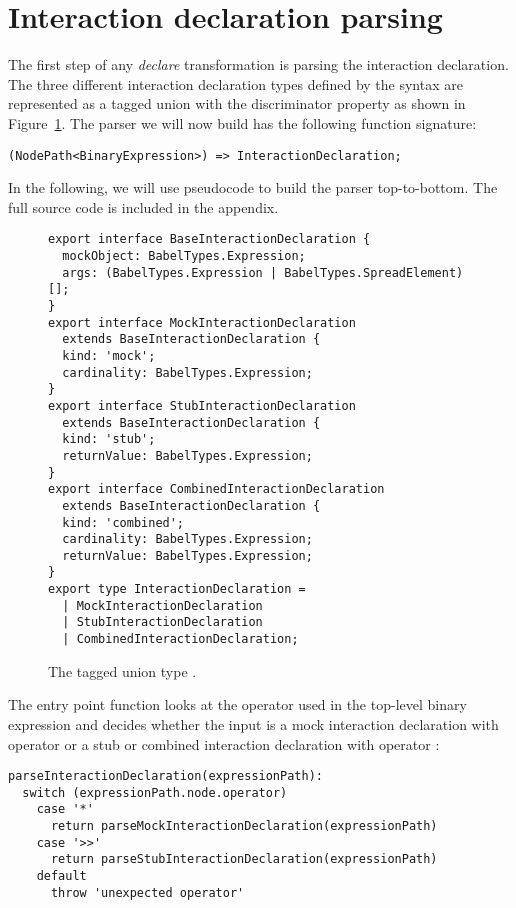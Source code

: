 \section{Interaction declaration parsing}
The first step of any \textit{declare} transformation
is parsing the interaction declaration.
The three different interaction declaration types defined by the syntax
are represented as a tagged union 
with the discriminator property 
as shown in Figure~\ref{fig:InteractionDeclarationType}.
The parser we will now build has the following function signature:
\begin{verbatim}
(NodePath<BinaryExpression>) => InteractionDeclaration;
\end{verbatim}
In the following, we will use pseudocode to build the parser top-to-bottom.
The full source code is included in the appendix.

\begin{figure}
  \begin{verbatim}
export interface BaseInteractionDeclaration {
  mockObject: BabelTypes.Expression;
  args: (BabelTypes.Expression | BabelTypes.SpreadElement)[];
}
export interface MockInteractionDeclaration
  extends BaseInteractionDeclaration {
  kind: 'mock';
  cardinality: BabelTypes.Expression;
}
export interface StubInteractionDeclaration
  extends BaseInteractionDeclaration {
  kind: 'stub';
  returnValue: BabelTypes.Expression;
}
export interface CombinedInteractionDeclaration
  extends BaseInteractionDeclaration {
  kind: 'combined';
  cardinality: BabelTypes.Expression;
  returnValue: BabelTypes.Expression;
}
export type InteractionDeclaration =
  | MockInteractionDeclaration
  | StubInteractionDeclaration
  | CombinedInteractionDeclaration;
  \end{verbatim}
  \caption{
    The tagged union type .
  }\label{fig:InteractionDeclarationType}
\end{figure}

The entry point function 
looks at the operator used in the top-level binary expression
and decides whether the input is
a mock interaction declaration with operator 
or a stub or combined interaction declaration with operator :
\begin{verbatim}
parseInteractionDeclaration(expressionPath):
  switch (expressionPath.node.operator)
    case '*'
      return parseMockInteractionDeclaration(expressionPath)
    case '>>'
      return parseStubInteractionDeclaration(expressionPath)
    default
      throw 'unexpected operator'
\end{verbatim}

